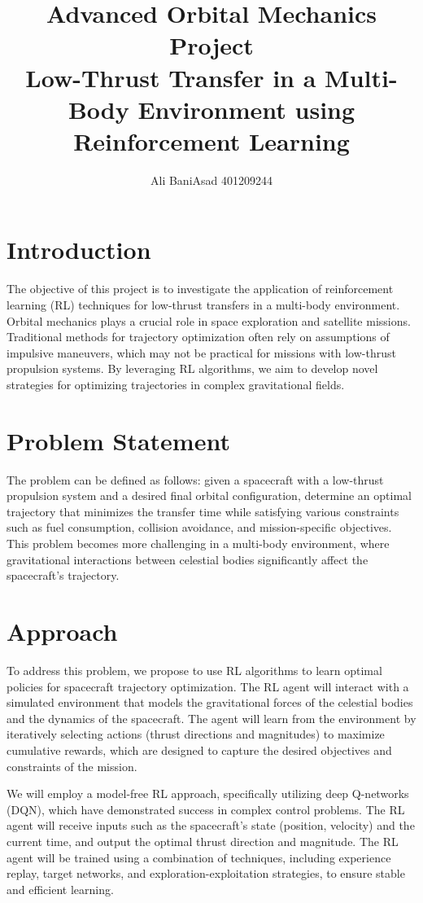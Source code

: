 \documentclass{article}
\title{Advanced Orbital Mechanics Project \\ Low-Thrust Transfer in a Multi-Body Environment using Reinforcement Learning}
\author{Ali BaniAsad 401209244}
\begin{document}
	\maketitle

\section{Introduction}
The objective of this project is to investigate the application of reinforcement learning (RL) techniques for low-thrust transfers in a multi-body environment. Orbital mechanics plays a crucial role in space exploration and satellite missions. Traditional methods for trajectory optimization often rely on assumptions of impulsive maneuvers, which may not be practical for missions with low-thrust propulsion systems. By leveraging RL algorithms, we aim to develop novel strategies for optimizing trajectories in complex gravitational fields.

\section{Problem Statement}
The problem can be defined as follows: given a spacecraft with a low-thrust propulsion system and a desired final orbital configuration, determine an optimal trajectory that minimizes the transfer time while satisfying various constraints such as fuel consumption, collision avoidance, and mission-specific objectives. This problem becomes more challenging in a multi-body environment, where gravitational interactions between celestial bodies significantly affect the spacecraft's trajectory.

\section{Approach}
To address this problem, we propose to use RL algorithms to learn optimal policies for spacecraft trajectory optimization. The RL agent will interact with a simulated environment that models the gravitational forces of the celestial bodies and the dynamics of the spacecraft. The agent will learn from the environment by iteratively selecting actions (thrust directions and magnitudes) to maximize cumulative rewards, which are designed to capture the desired objectives and constraints of the mission.

We will employ a model-free RL approach, specifically utilizing deep Q-networks (DQN), which have demonstrated success in complex control problems. The RL agent will receive inputs such as the spacecraft's state (position, velocity) and the current time, and output the optimal thrust direction and magnitude. The RL agent will be trained using a combination of techniques, including experience replay, target networks, and exploration-exploitation strategies, to ensure stable and efficient learning.
\end{document}
